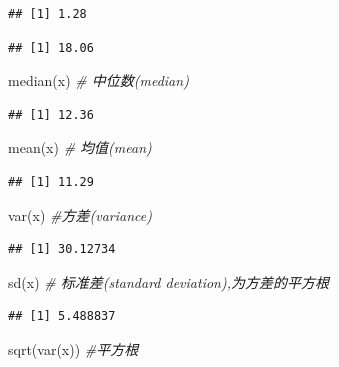 \documentclass[
]{book}
\newenvironment{Shaded}{\begin{snugshade}}{\end{snugshade}}
\newcommand{\CommentTok}[1]{\textcolor[rgb]{0.56,0.35,0.01}{\textit{#1}}}
\newcommand{\FunctionTok}[1]{\textcolor[rgb]{0.00,0.00,0.00}{#1}}
\newcommand{\NormalTok}[1]{#1}
\begin{document}
\begin{verbatim}
## [1] 1.28
\end{verbatim}

\begin{verbatim}
## [1] 18.06
\end{verbatim}

\begin{Shaded}
\begin{Highlighting}[]
\FunctionTok{median}\NormalTok{(x)  }\CommentTok{\# 中位数(median)}
\end{Highlighting}
\end{Shaded}

\begin{verbatim}
## [1] 12.36
\end{verbatim}

\begin{Shaded}
\begin{Highlighting}[]
\FunctionTok{mean}\NormalTok{(x)    }\CommentTok{\# 均值(mean)}
\end{Highlighting}
\end{Shaded}

\begin{verbatim}
## [1] 11.29
\end{verbatim}

\begin{Shaded}
\begin{Highlighting}[]
\FunctionTok{var}\NormalTok{(x)     }\CommentTok{\#方差(variance)}
\end{Highlighting}
\end{Shaded}

\begin{verbatim}
## [1] 30.12734
\end{verbatim}

\begin{Shaded}
\begin{Highlighting}[]
\FunctionTok{sd}\NormalTok{(x)      }\CommentTok{\# 标准差(standard deviation),为方差的平方根}
\end{Highlighting}
\end{Shaded}

\begin{verbatim}
## [1] 5.488837
\end{verbatim}

\begin{Shaded}
\begin{Highlighting}[]
\FunctionTok{sqrt}\NormalTok{(}\FunctionTok{var}\NormalTok{(x)) }\CommentTok{\#平方根}
\end{Highlighting}
\end{Shaded}
\end{document}

